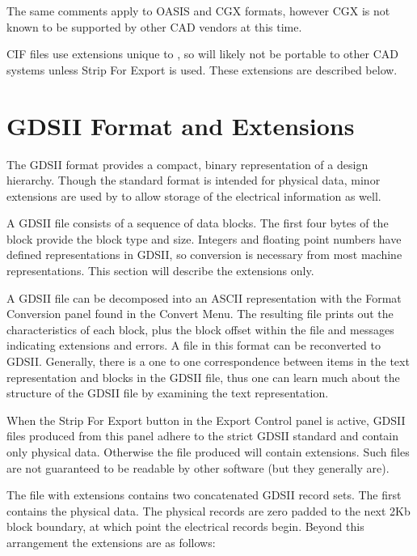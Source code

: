 The same comments apply to OASIS and CGX formats, however CGX is not
known to be supported by other CAD vendors at this time.

CIF files use extensions unique to {\Xic}, so will likely not be
portable to other CAD systems unless {\cb Strip For Export} is used. 
These extensions are described below.

\section{GDSII Format and Extensions}

The GDSII format provides a compact, binary representation of a design
hierarchy.  Though the standard format is intended for physical data,
minor extensions are used by {\Xic} to allow storage of the electrical
information as well.

A GDSII file consists of a sequence of data blocks.  The first four
bytes of the block provide the block type and size.  Integers and
floating point numbers have defined representations in GDSII, so
conversion is necessary from most machine representations.  This
section will describe the extensions only.

A GDSII file can be decomposed into an ASCII representation with the
{\cb Format Conversion} panel found in the {\cb Convert Menu}.  The
resulting file prints out the characteristics of each block, plus the
block offset within the file and messages indicating extensions and
errors.  A file in this format can be reconverted to GDSII. 
Generally, there is a one to one correspondence between items in the
text representation and blocks in the GDSII file, thus one can learn
much about the structure of the GDSII file by examining the text
representation.

When the {\cb Strip For Export} button in the {\cb Export Control}
panel is active, GDSII files produced from this panel adhere to the
strict GDSII standard and contain only physical data.  Otherwise the
file produced will contain extensions.  Such files are not guaranteed
to be readable by other software (but they generally are).

The file with extensions contains two concatenated GDSII record sets. 
The first contains the physical data.  The physical records are zero
padded to the next 2Kb block boundary, at which point the electrical
records begin.  Beyond this arrangement the extensions are as follows:

